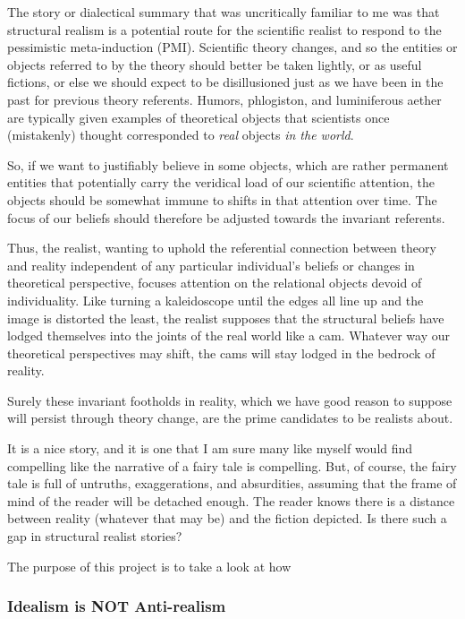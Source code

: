 The story or dialectical summary that was uncritically familiar to me was that structural realism is a potential route for the scientific realist to respond to the pessimistic meta-induction (PMI).  Scientific theory changes, and so the entities or objects referred to by the theory should better be taken lightly, or as useful fictions, or else we should expect to be disillusioned just as we have been in the past for previous theory referents.  Humors, phlogiston, and luminiferous aether are typically given examples of theoretical objects that scientists once (mistakenly) thought corresponded to \emph{real} objects \emph{in the world}.

So, if we want to justifiably believe in some objects, which are rather permanent entities that potentially carry the veridical load of our scientific attention, the objects should be somewhat immune to shifts in that attention over time.  The focus of our beliefs should therefore be adjusted towards the invariant referents.

Thus, the realist, wanting to uphold the referential connection between theory and reality independent of any particular individual's beliefs or changes in theoretical perspective, focuses attention on the relational objects devoid of individuality.  Like turning a kaleidoscope until the edges all line up and the image is distorted the least, the realist supposes that the structural beliefs have lodged themselves into the joints of the real world like a cam.  Whatever way our theoretical perspectives may shift, the cams will stay lodged in the bedrock of reality.

Surely these invariant footholds in reality, which we have good reason to suppose will persist through theory change, are the prime candidates to be realists about.

It is a nice story, and it is one that I am sure many like myself would find compelling like the narrative of a fairy tale is compelling.  But, of course, the fairy tale is full of untruths, exaggerations, and absurdities, assuming that the frame of mind of the reader will be detached enough.  The reader knows there is a distance between reality (whatever that may be) and the fiction depicted.  Is there such a gap in structural realist stories?

The purpose of this project is to take a look at how 


\subsubsection{Idealism is NOT Anti-realism}

